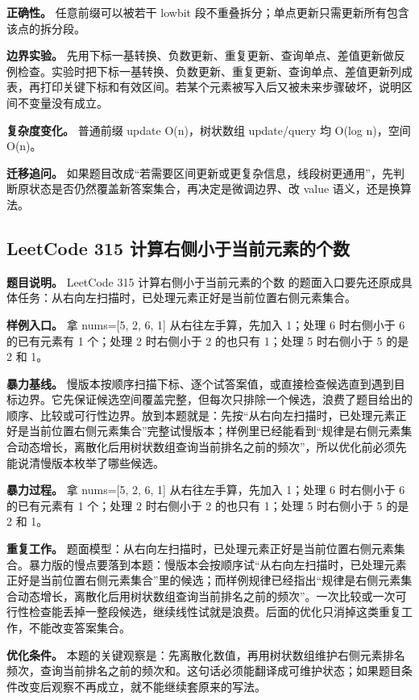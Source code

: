 \textbf{正确性。} 任意前缀可以被若干 lowbit 段不重叠拆分；单点更新只需更新所有包含该点的拆分段。

\textbf{边界实验。} 先用下标一基转换、负数更新、重复更新、查询单点、差值更新做反例检查。实验时把下标一基转换、负数更新、重复更新、查询单点、差值更新列成表，再打印关键下标和有效区间。若某个元素被写入后又被未来步骤破坏，说明区间不变量没有成立。

\textbf{复杂度变化。} 普通前缀 update O(n)，树状数组 update/query 均 O(log n)，空间 O(n)。

\textbf{迁移追问。} 如果题目改成“若需要区间更新或更复杂信息，线段树更通用”，先判断原状态是否仍然覆盖新答案集合，再决定是微调边界、改 value 语义，还是换算法。

\subsection{LeetCode 315 计算右侧小于当前元素的个数}

\textbf{题目说明。} LeetCode 315 计算右侧小于当前元素的个数 的题面入口要先还原成具体任务：从右向左扫描时，已处理元素正好是当前位置右侧元素集合。

\textbf{样例入口。} 拿 nums=[5, 2, 6, 1] 从右往左手算，先加入 1；处理 6 时右侧小于 6 的已有元素有 1 个；处理 2 时右侧小于 2 的也只有 1；处理 5 时右侧小于 5 的是 2 和 1。

\textbf{暴力基线。} 慢版本按顺序扫描下标、逐个试答案值，或直接检查候选直到遇到目标边界。它先保证候选空间覆盖完整，但每次只排除一个候选，浪费了题目给出的顺序、比较或可行性边界。放到本题就是：先按“从右向左扫描时，已处理元素正好是当前位置右侧元素集合”完整试慢版本；样例里已经能看到“规律是右侧元素集合动态增长，离散化后用树状数组查询当前排名之前的频次”，所以优化前必须先能说清慢版本枚举了哪些候选。

\textbf{暴力过程。} 拿 nums=[5, 2, 6, 1] 从右往左手算，先加入 1；处理 6 时右侧小于 6 的已有元素有 1 个；处理 2 时右侧小于 2 的也只有 1；处理 5 时右侧小于 5 的是 2 和 1。

\textbf{重复工作。} 题面模型：从右向左扫描时，已处理元素正好是当前位置右侧元素集合。暴力版的慢点要落到本题：慢版本会按顺序试“从右向左扫描时，已处理元素正好是当前位置右侧元素集合”里的候选；而样例规律已经指出“规律是右侧元素集合动态增长，离散化后用树状数组查询当前排名之前的频次”。一次比较或一次可行性检查能丢掉一整段候选，继续线性试就是浪费。后面的优化只消掉这类重复工作，不能改变答案集合。

\textbf{优化条件。} 本题的关键观察是：先离散化数值，再用树状数组维护右侧元素排名频次，查询当前排名之前的频次和。这句话必须能翻译成可维护状态；如果题目条件改变后观察不再成立，就不能继续套原来的写法。

